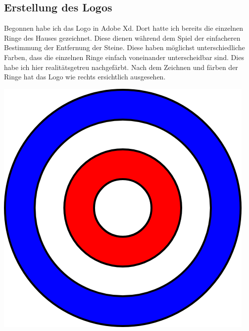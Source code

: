 \documentclass[11pt]{article}
\begin{document}
    \noindent\begin{minipage}{0.6\textwidth}
                 \subsection{Erstellung des Logos}
                 Begonnen habe ich das Logo in Adobe Xd. Dort hatte ich bereits die einzelnen Ringe des Hauses gezeichnet.
                 Diese dienen während dem Spiel der einfacheren Bestimmung der Entfernung der Steine. Diese haben
                 möglichst unterschiedliche Farben, dass die einzelnen Ringe einfach voneinander unterscheidbar sind.
                 Dies habe ich hier realitätsgetreu nachgefärbt. Nach dem Zeichnen und färben der Ringe hat das Logo
                 wie rechts ersichtlich ausgesehen.
    \end{minipage}
    \hfill
    \begin{minipage}[c]{0.3\textwidth}
        \raggedleft
        \includegraphics[width=\linewidth]{media/curling_logo_step1}
    \end{minipage}
\end{document}
